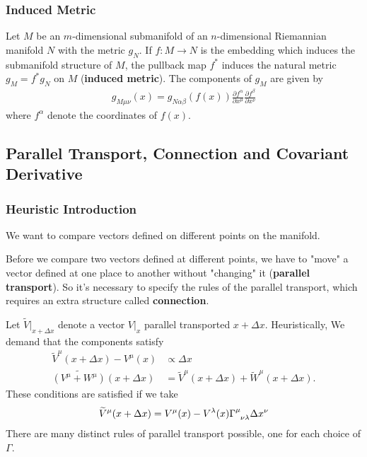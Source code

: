 \documentclass[10pt]{article}
\begin{document}
\subsubsection{Induced Metric}
Let $M$ be an $m$-dimensional submanifold of an $n$-dimensional Riemannian manifold $N$ with the metric $g_N$.
If $f:M\to N$ is the embedding which induces the submanifold structure of $M$, the pullback map $f^*$ induces the natural metric $g_M=f^* g_N$ on $M$ (\textbf{induced metric}).
The components of $g_M$ are given by
\begin{align}
    g_{M\mu\nu}(x)=g_{N\alpha\beta}(f(x))\frac{\partial f^\alpha}{\partial x^\mu}\frac{\partial f^\beta}{\partial x^\nu}
\end{align}
where $f^\alpha$ denote the coordinates of $f(x)$.

\subsection{Parallel Transport, Connection and Covariant Derivative}
\subsubsection{Heuristic Introduction}
We want to compare vectors defined on different points on the manifold.
\begin{intu}
    Before we compare two vectors defined at different points, we have to "move" a vector defined at one place to another without "changing" it (\textbf{parallel transport}).
    So it's necessary to specify the rules of the parallel transport, which requires an extra structure called \textbf{connection}.
\end{intu}
Let $\widetilde{V} \vert_{x+\Delta x}$ denote a vector $V|_{x}$ parallel transported $x+\Delta x$.
Heuristically, We demand that the components satisfy
\begin{align}
    \widetilde{V}^\mu(x+\Delta x)-V^\mu(x) & \propto\Delta x                                               \\
    \widetilde{(V^\mu+W^\mu)}(x+\Delta x)  & =\widetilde{V}^\mu(x+\Delta x)+\widetilde{W}^\mu(x+\Delta x).
\end{align}
These conditions are satisfied if we take
\begin{align}
    \widetilde{V}^\mu(x+\Delta x)=V^\mu(x)-V^\lambda(x)\tensor{\Gamma}{^{\mu}_{\nu\lambda}}\Delta x^\nu
\end{align}
There are many distinct rules of parallel transport possible, one for each choice of $\Gamma$.
\end{document}
